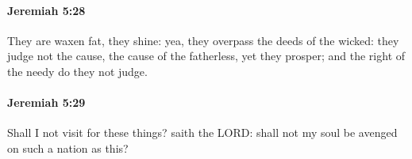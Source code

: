 		\paragraph{Jeremiah 5:28} %
			\label{JEREMIAH-5-28}

			They are waxen fat, they shine: yea, they overpass the deeds of the wicked: they judge not the cause, the cause of the fatherless, yet they prosper; and the right of the needy do they not judge.


		\paragraph{Jeremiah 5:29} %
			\label{JEREMIAH-5-29}

			Shall I not visit for these things? saith the LORD: shall not my soul be avenged on such a nation as this?


